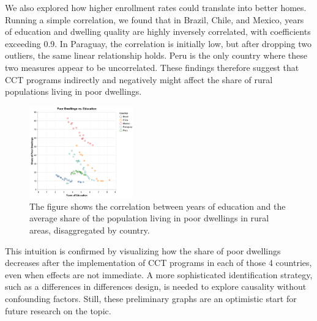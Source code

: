 \documentclass[
  10pt,
]{article}
\begin{document}
We also explored how higher enrollment rates could translate into better
homes. Running a simple correlation, we found that in Brazil, Chile, and
Mexico, years of education and dwelling quality are highly inversely
correlated, with coefficients exceeding 0.9. In Paraguay, the
correlation is initially low, but after dropping two outliers, the same
linear relationship holds. Peru is the only country where these two
measures appear to be uncorrelated. These findings therefore suggest
that CCT programs indirectly and negatively might affect the share of
rural populations living in poor dwellings.

\begin{figure}[H]

{\centering \includegraphics[width=0.4\textwidth,height=\textheight]{pictures/corr_edu_dwelling.png}

}

\caption{The figure shows the correlation between years of education and
the average share of the population living in poor dwellings in rural
areas, disaggregated by country.}

\end{figure}%

This intuition is confirmed by visualizing how the share of poor
dwellings decreases after the implementation of CCT programs in each of
those 4 countries, even when effects are not immediate. A more
sophisticated identification strategy, such as a differences in
differences design, is needed to explore causality without confounding
factors. Still, these preliminary graphs are an optimistic start for
future research on the topic.
\end{document}
